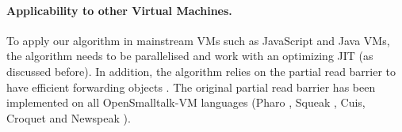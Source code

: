 \documentclass[sigplan,10pt,review,anonymous]{acmart}\settopmatter{printfolios=true,printccs=false,printacmref=false}
\newcommand{\todo}[1]{\color{orange}\fbox{\bfseries\sffamily\scriptsize TODO:}{\sf\small$\blacktriangleright$\textit{#1}$\blacktriangleleft$}\color{black}}
\newcommand{\eem}[1]{\color{olive}\fbox{\bfseries\sffamily\scriptsize Eliot:}{\sf\small$\blacktriangleright$\textit{#1}$\blacktriangleleft$}\color{black}}
\def\OpenSmalltalkVM{OpenSmalltalk-VM\xspace}
\begin{document}

\paragraph{Applicability to other Virtual Machines.}
To apply our algorithm in mainstream VMs such as JavaScript and Java VMs, the algorithm needs to be parallelised and work with an optimizing JIT (as discussed before).
In addition, the algorithm relies on the partial read barrier to have efficient forwarding objects \cite{Forwarders}. The original partial read barrier has been implemented on all \OpenSmalltalkVM languages (Pharo \cite{PharoByExample}, Squeak \cite{SqueakByExample}, Cuis, Croquet and Newspeak \cite{NewspeakOopsla}).
\end{document}
